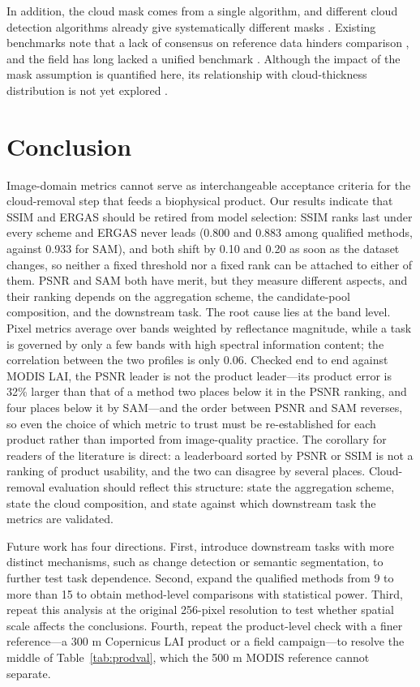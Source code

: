 \documentclass[a4paper,fleqn]{cas-dc}
\begin{document}
In addition, the cloud mask comes from a single algorithm, and different cloud detection algorithms already give systematically different masks \cite{ref39,ref40}. Existing benchmarks note that a lack of consensus on reference data hinders comparison \cite{ref41}, and the field has long lacked a unified benchmark \cite{ref42}. Although the impact of the mask assumption is quantified here, its relationship with cloud-thickness distribution is not yet explored \cite{ref31}.

\section{Conclusion}

Image-domain metrics cannot serve as interchangeable acceptance criteria for the cloud-removal step that feeds a biophysical product. Our results indicate that SSIM and ERGAS should be retired from model selection: SSIM ranks last under every scheme and ERGAS never leads (0.800 and 0.883 among qualified methods, against 0.933 for SAM), and both shift by 0.10 and 0.20 as soon as the dataset changes, so neither a fixed threshold nor a fixed rank can be attached to either of them. PSNR and SAM both have merit, but they measure different aspects, and their ranking depends on the aggregation scheme, the candidate-pool composition, and the downstream task. The root cause lies at the band level. Pixel metrics average over bands weighted by reflectance magnitude, while a task is governed by only a few bands with high spectral information content; the correlation between the two profiles is only 0.06. Checked end to end against MODIS LAI, the PSNR leader is not the product leader---its product error is 32\% larger than that of a method two places below it in the PSNR ranking, and four places below it by SAM---and the order between PSNR and SAM reverses, so even the choice of which metric to trust must be re-established for each product rather than imported from image-quality practice. The corollary for readers of the literature is direct: a leaderboard sorted by PSNR or SSIM is not a ranking of product usability, and the two can disagree by several places. Cloud-removal evaluation should reflect this structure: state the aggregation scheme, state the cloud composition, and state against which downstream task the metrics are validated.

Future work has four directions. First, introduce downstream tasks with more distinct mechanisms, such as change detection or semantic segmentation, to further test task dependence. Second, expand the qualified methods from 9 to more than 15 to obtain method-level comparisons with statistical power. Third, repeat this analysis at the original 256-pixel resolution to test whether spatial scale affects the conclusions. Fourth, repeat the product-level check with a finer reference---a 300 m Copernicus LAI product or a field campaign---to resolve the middle of Table~\ref{tab:prodval}, which the 500 m MODIS reference cannot separate.
\printcredits
\end{document}
